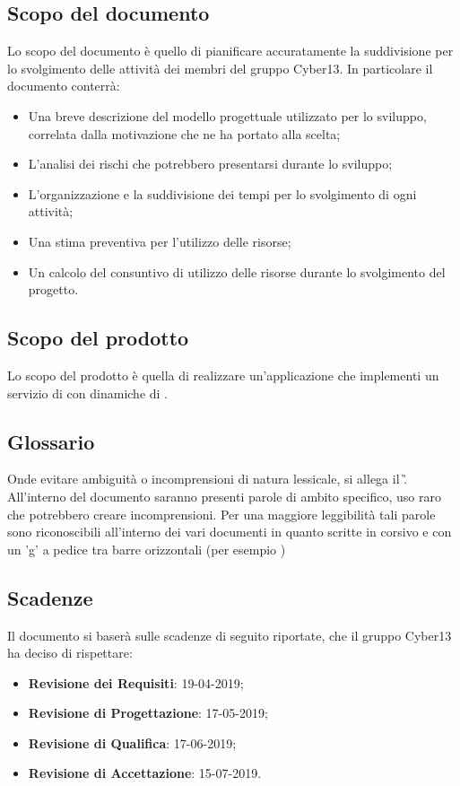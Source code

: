 \subsection{Scopo del documento}
Lo scopo del documento è quello di pianificare accuratamente la suddivisione per lo svolgimento delle attività dei membri del gruppo Cyber13. In particolare il documento conterrà:
\begin{itemize}
    \item Una breve descrizione del modello progettuale utilizzato per lo sviluppo, correlata dalla motivazione che ne ha portato alla scelta;
    \item L'analisi dei rischi che potrebbero presentarsi durante lo sviluppo;
    \item L'organizzazione e la suddivisione dei tempi per lo svolgimento di ogni attività;
    \item Una stima preventiva per l'utilizzo delle risorse;
    \item Un calcolo del consuntivo di utilizzo delle risorse durante lo svolgimento del progetto.
\end{itemize}
\subsection{Scopo del prodotto}
Lo scopo del prodotto è quella di realizzare un'applicazione  che implementi un servizio di   con dinamiche di .
\subsection{Glossario}
Onde evitare ambiguità o incomprensioni di natura lessicale, si allega il \G.
All'interno del documento saranno presenti parole di ambito specifico, uso raro che potrebbero creare incomprensioni. Per una maggiore leggibilità tali parole sono riconoscibili all'interno dei vari documenti in quanto scritte in corsivo e con un 'g' a pedice tra barre orizzontali (per esempio )
\subsection{Scadenze}
Il documento si baserà sulle scadenze di seguito riportate, che il gruppo Cyber13 ha deciso di rispettare:
\begin{itemize}
    \item \textbf{Revisione dei Requisiti}: 19-04-2019;
    \item \textbf{Revisione di Progettazione}: 17-05-2019;
    \item \textbf{Revisione di Qualifica}: 17-06-2019;
    \item \textbf{Revisione di Accettazione}: 15-07-2019.
\end{itemize}

